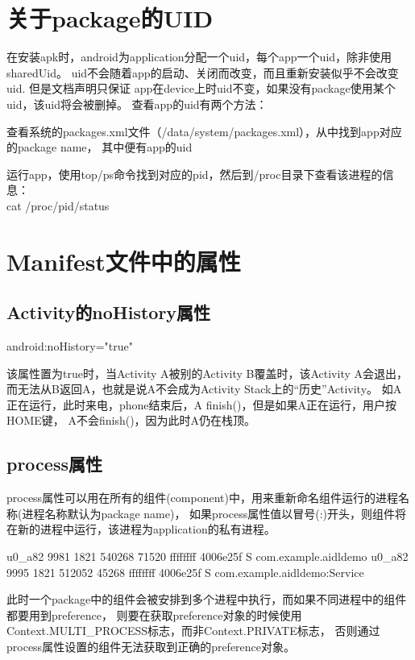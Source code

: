 ﻿\documentclass[a4paper,11pt]{article}
\begin{document}
  \section[关于package的UID]{关于package的UID}
  在安装apk时，android为application分配一个uid，每个app一个uid，除非使用sharedUid。
	uid不会随着app的启动、关闭而改变，而且重新安装似乎不会改变uid. 但是文档声明只保证
	app在device上时uid不变，如果没有package使用某个uid，该uid将会被删掉。
	查看app的uid有两个方法：
  \begin{coloredenumerate}
    \item 查看系统的packages.xml文件（/data/system/packages.xml），从中找到app对应的package name，
		      其中便有app的uid
    \item 运行app，使用top/ps命令找到对应的pid，然后到/proc目录下查看该进程的信息：\\
      		cat /proc/\lt pid\gt/status
  \end{coloredenumerate}


  \section[Manifest文件中的属性]{Manifest文件中的属性}
  \subsection[Activity的noHistory属性]{Activity的noHistory属性}
  android:noHistory="true"

  该属性置为true时，当Activity A被别的Activity B覆盖时，该Activity A会退出，
  而无法从B返回A，也就是说A不会成为Activity Stack上的“历史”Activity。
  如A正在运行，此时来电，phone结束后，A finish()，但是如果A正在运行，用户按HOME键，
  A不会finish()，因为此时A仍在栈顶。

  \subsection[process属性]{process属性}
  process属性可以用在所有的组件(component)中，用来重新命名组件运行的进程名称(进程名称默认为package name)，
  如果process属性值以冒号(:)开头，则组件将在新的进程中运行，该进程为application的私有进程。\par
  \begin{bashcode}
u0_a82    9981  1821  540268 71520 ffffffff 4006e25f S com.example.aidldemo
u0_a82    9995  1821  512052 45268 ffffffff 4006e25f S com.example.aidldemo:Service
  \end{bashcode}

  此时一个package中的组件会被安排到多个进程中执行，而如果不同进程中的组件都要用到preference，
  则要在获取preference对象的时候使用Context.MULTI\_PROCESS标志，而非Context.PRIVATE标志，
  否则通过process属性设置的组件无法获取到正确的preference对象。
\end{document}
